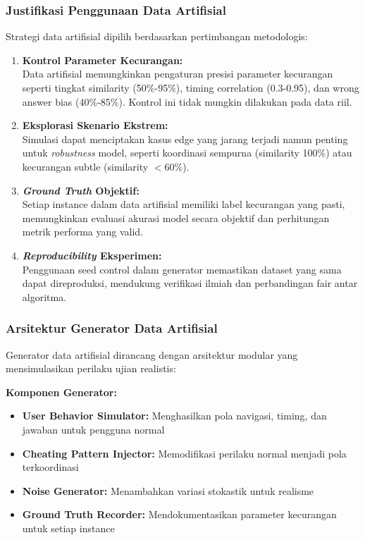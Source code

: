 \subsubsection{Justifikasi Penggunaan Data Artifisial}
\label{sec:justifikasiDataArtifisial}

Strategi data artifisial dipilih berdasarkan pertimbangan metodologis:

\begin{enumerate}
    \item \textbf{Kontrol Parameter Kecurangan:} \\
    Data artifisial memungkinkan pengaturan presisi parameter kecurangan seperti tingkat similarity (50\%-95\%), timing correlation (0.3-0.95), dan wrong answer bias (40\%-85\%). Kontrol ini tidak mungkin dilakukan pada data riil.
    
    \item \textbf{Eksplorasi Skenario Ekstrem:} \\
    Simulasi dapat menciptakan kasus edge yang jarang terjadi namun penting untuk \textit{robustness} model, seperti koordinasi sempurna (similarity 100\%) atau kecurangan subtle (similarity $<60\%$).
    
    \item \textbf{\textit{Ground Truth} Objektif:} \\
    Setiap instance dalam data artifisial memiliki label kecurangan yang pasti, memungkinkan evaluasi akurasi model secara objektif dan perhitungan metrik performa yang valid.
    
    \item \textbf{\textit{Reproducibility} Eksperimen:} \\
    Penggunaan seed control dalam generator memastikan dataset yang sama dapat direproduksi, mendukung verifikasi ilmiah dan perbandingan fair antar algoritma.
\end{enumerate}

\subsubsection{Arsitektur Generator Data Artifisial}
\label{sec:arsitekturGenerator}

Generator data artifisial dirancang dengan arsitektur modular yang mensimulasikan perilaku ujian realistis:

\textbf{Komponen Generator:}
\begin{itemize}
    \item \textbf{User Behavior Simulator:} Menghasilkan pola navigasi, timing, dan jawaban untuk pengguna normal
    \item \textbf{Cheating Pattern Injector:} Memodifikasi perilaku normal menjadi pola terkoordinasi
    \item \textbf{Noise Generator:} Menambahkan variasi stokastik untuk realisme
    \item \textbf{Ground Truth Recorder:} Mendokumentasikan parameter kecurangan untuk setiap instance
\end{itemize}


